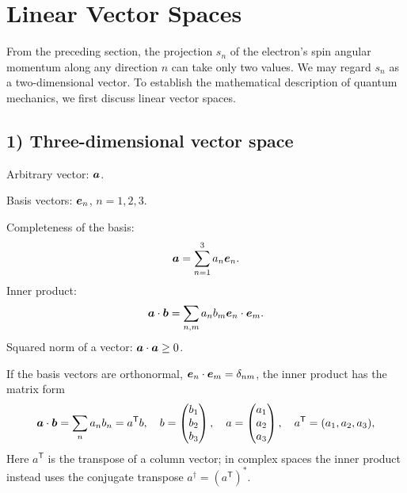 \section{Linear Vector Spaces}
From the preceding section, the projection $s_n$ of the electron's spin angular momentum along any direction $n$ can take only two values. We may regard $s_n$ as a two-dimensional vector. To establish the mathematical description of quantum mechanics, we first discuss linear vector spaces.
\subsection*{1) Three-dimensional vector space}
\begin{center}\end{center}
Arbitrary vector: $\bm{a}$.

Basis vectors: $\bm{e}_n$, $n=1,2,3$.

Completeness of the basis:
\begin{equation}
\bm{a}=\sum_{n=1}^{3}a_n\bm{e}_n.
\end{equation}
Inner product:
\begin{equation}
\bm{a}\cdot\bm{b}=\sum_{n,m}a_nb_m\bm{e}_n\cdot\bm{e}_m.
\end{equation}
Squared norm of a vector: $\bm{a}\cdot\bm{a}\geq0$.

If the basis vectors are orthonormal, $\bm{e}_n\cdot\bm{e}_m=\delta_{nm}$, the inner product has the matrix form
\begin{equation}
\bm{a}\cdot\bm{b}=\sum_n a_nb_n=a^{\mathsf T}b,
\quad b=\begin{pmatrix}b_1\\b_2\\b_3\end{pmatrix},\quad
 a=\begin{pmatrix}a_1\\a_2\\a_3\end{pmatrix},\quad
 a^{\mathsf T}=(a_1,a_2,a_3),
\end{equation}
Here $a^{\mathsf T}$ is the transpose of a column vector; in complex spaces the inner product instead uses the conjugate transpose $a^\dagger=(a^{\mathsf T})^*$.

